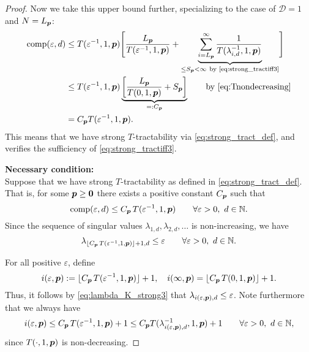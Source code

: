 \documentclass[sort&compress]{elsarticle}
\newcommand{\thed}{\mathscr{D}}
\begin{document}
\begin{proof}
Now we take this upper bound further, specializing to the case of $\thed=1$ and $N=L_{\boldsymbol{p}}$:
\begin{align*}
       \operatorname{comp}(\varepsilon,d)
       & \le T(\varepsilon^{-1},1, \boldsymbol{p}) \Biggl [ \frac{L_{\boldsymbol{p}}}{T(\varepsilon^{-1},1, \boldsymbol{p})}  + \underbrace{\sum_{i=L_{\boldsymbol{p}}}^\infty \frac{1}{T(\lambda_{i, d}^{-1},1,\boldsymbol{p})}}_{\le S_{\boldsymbol{p}} <\infty\ \text{by \eqref{eq:strong_tractiff3}} }
        \Biggr] \\
       & \le T(\varepsilon^{-1},1,\boldsymbol{p}) \underbrace{\left[\frac{L_{\boldsymbol{p}}}{T(0,1, \boldsymbol{p})} + S_{\boldsymbol{p}} \right]}_{=:C_{\boldsymbol{p}}}
       \qquad \text{by \eqref{eq:Tnondecreasing}}\\
       & =  C_{\boldsymbol{p}}T(\varepsilon^{-1},1,\boldsymbol{p}).
\end{align*}
This means that we have strong $T$-tractability via \eqref{eq:strong_tract_def}, and verifies the sufficiency of \eqref{eq:strong_tractiff3}.



\bigskip
\noindent \textbf{Necessary condition:} \\
Suppose that we have strong
$T$-tractability as defined in \eqref{eq:strong_tract_def}. That is, for some $\boldsymbol{p} \ge \boldsymbol{0}$ there exists a positive constant $C_{\boldsymbol{p}}$ such that
\[
\operatorname{comp}(\varepsilon,d)\le C_{\boldsymbol{p}}\, T(\varepsilon^{-1},1,\boldsymbol{p})
\qquad \forall \varepsilon > 0, \ d \in \mathbb{N}.
\]
Since the sequence of singular values $\lambda_{1,d}, \lambda_{2,d}, \ldots $ is non-increasing, we have
\begin{equation}\label{eq:lambda_K_strong3}
\lambda_{\lfloor C_{\boldsymbol{p}}\, T(\varepsilon^{-1},1,\boldsymbol{p})\rfloor +1,d}\le \varepsilon \qquad \forall \varepsilon > 0, \ d \in \mathbb{N}.
\end{equation}

For all positive $\varepsilon$, define
\begin{equation}\label{eq:iepsp}
i(\varepsilon,\boldsymbol{p}):= \lfloor C_{\boldsymbol{p}}\, T(\varepsilon^{-1},1,\boldsymbol{p})\rfloor +1, \quad
i(\infty,\boldsymbol{p}) =\lfloor C_{\boldsymbol{p}}\, T(0,1,\boldsymbol{p})\rfloor +1.
\end{equation}
Thus, it follows by \eqref{eq:lambda_K_strong3} that $\lambda_{i(\varepsilon,\boldsymbol{p}),d} \le \varepsilon$.
Note furthermore that we always have
\[
i(\varepsilon,\boldsymbol{p})\le C_{\boldsymbol{p}}\, T(\varepsilon^{-1},1,\boldsymbol{p})+1 \le C_{\boldsymbol{p}} T(\lambda_{i(\varepsilon,\boldsymbol{p}),d}^{-1},1,\boldsymbol{p})+1 \qquad \forall \varepsilon > 0, \ d \in \mathbb{N},
\]
since
$T(\cdot,1, \boldsymbol{p})$ is non-decreasing.


\end{proof}
\end{document}

